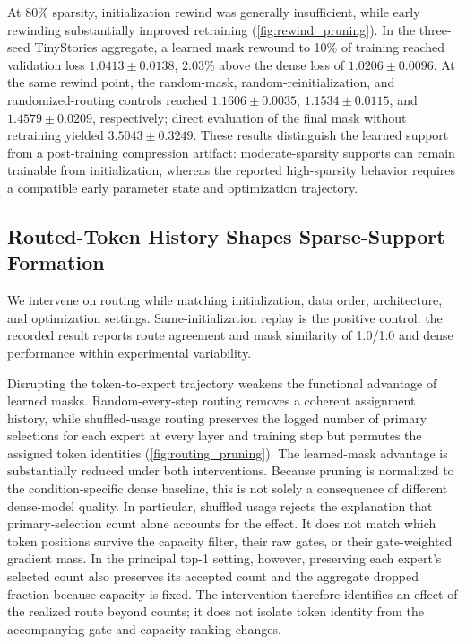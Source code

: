 \documentclass{article}
\begin{document}
At 80\% sparsity, initialization rewind was generally insufficient, while early
rewinding substantially improved retraining (\cref{fig:rewind_pruning}).
In the three-seed TinyStories aggregate, a learned mask rewound to 10\% of
training reached validation loss $1.0413\pm0.0138$, 2.03\% above the dense loss
of $1.0206\pm0.0096$. At the same rewind point, the random-mask,
random-reinitialization, and randomized-routing controls reached
$1.1606\pm0.0035$, $1.1534\pm0.0115$, and $1.4579\pm0.0209$, respectively;
direct evaluation of the final mask without retraining yielded
$3.5043\pm0.3249$. These
results distinguish the learned support from a post-training compression
artifact: moderate-sparsity supports can remain trainable from initialization,
whereas the reported high-sparsity behavior requires a compatible early
parameter state and optimization trajectory.

\subsection{Routed-Token History Shapes Sparse-Support Formation}
\label{sec:results_routing}

We intervene on routing while matching initialization, data order,
architecture, and optimization settings. Same-initialization replay is the
positive control: the recorded result reports route agreement and mask
similarity of 1.0/1.0 and dense performance within experimental variability.

Disrupting the token-to-expert trajectory weakens the functional advantage of
learned masks. Random-every-step routing removes a coherent assignment history,
while shuffled-usage routing preserves the logged number of primary selections
for each expert at every layer and training step but permutes the assigned token
identities (\cref{fig:routing_pruning}). The learned-mask advantage is
substantially reduced under both interventions. Because pruning is normalized
to the condition-specific dense baseline, this is not solely a consequence of
different dense-model quality. In particular, shuffled usage rejects the
explanation that primary-selection count alone accounts for the effect. It does
not match which token positions survive the capacity filter, their raw gates,
or their gate-weighted gradient mass. In the principal top-1 setting, however,
preserving each expert's selected count also preserves its accepted count and
the aggregate dropped fraction because capacity is fixed. The intervention
therefore identifies an effect of the realized route beyond counts; it does not
isolate token identity from the accompanying gate and capacity-ranking changes.
\end{document}
